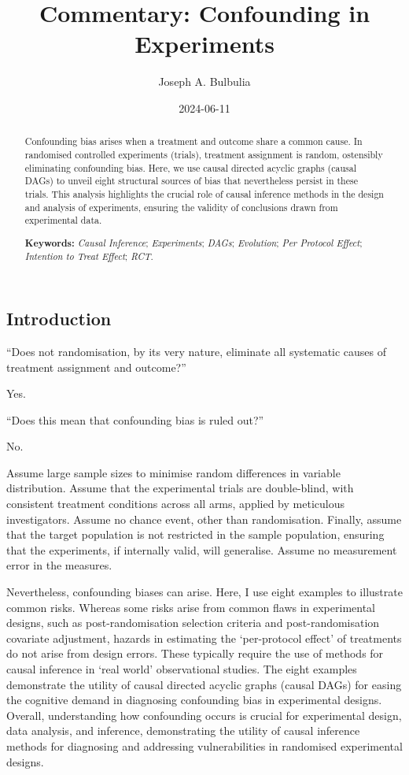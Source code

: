 \documentclass[
  single column]{article}
\title{Commentary: Confounding in Experiments}
\author{Joseph A. Bulbulia}
\affil{%
             \small{     Victoria University of Wellington, New Zealand
          ORCID \textcolor[HTML]{A6CE39}{\aiOrcid} ~0000-0002-5861-2056 }
              }
\date{2024-06-11}
\begin{document}
\maketitle
\begin{abstract}
Confounding bias arises when a treatment and outcome share a common
cause. In randomised controlled experiments (trials), treatment
assignment is random, ostensibly eliminating confounding bias. Here, we
use causal directed acyclic graphs (causal DAGs) to unveil eight
structural sources of bias that nevertheless persist in these trials.
This analysis highlights the crucial role of causal inference methods in
the design and analysis of experiments, ensuring the validity of
conclusions drawn from experimental data.

\textbf{Keywords:} \emph{Causal Inference}; \emph{Experiments};
\emph{DAGs}; \emph{Evolution}; \emph{Per Protocol Effect};
\emph{Intention to Treat Effect}; \emph{RCT}.
\end{abstract}

\subsection{Introduction}\label{introduction}

``Does not randomisation, by its very nature, eliminate all systematic
causes of treatment assignment and outcome?''

Yes.

``Does this mean that confounding bias is ruled out?''

No.

Assume large sample sizes to minimise random differences in variable
distribution. Assume that the experimental trials are double-blind, with
consistent treatment conditions across all arms, applied by meticulous
investigators. Assume no chance event, other than randomisation.
Finally, assume that the target population is not restricted in the
sample population, ensuring that the experiments, if internally valid,
will generalise. Assume no measurement error in the measures.

Nevertheless, confounding biases can arise. Here, I use eight examples
to illustrate common risks. Whereas some risks arise from common flaws
in experimental designs, such as post-randomisation selection criteria
and post-randomisation covariate adjustment, hazards in estimating the
`per-protocol effect' of treatments do not arise from design errors.
These typically require the use of methods for causal inference in `real
world' observational studies. The eight examples demonstrate the utility
of causal directed acyclic graphs (causal DAGs) for easing the cognitive
demand in diagnosing confounding bias in experimental designs. Overall,
understanding how confounding occurs is crucial for experimental design,
data analysis, and inference, demonstrating the utility of causal
inference methods for diagnosing and addressing vulnerabilities in
randomised experimental designs.
\end{document}
